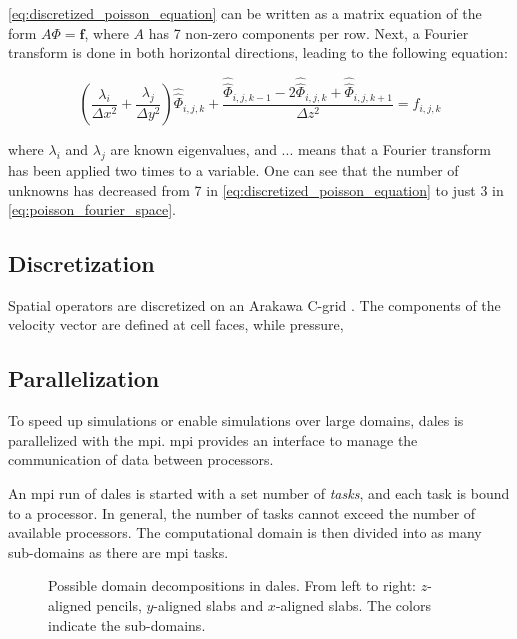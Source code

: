 \autoref{eq:discretized_poisson_equation} can be written as a matrix equation of the form $A \Phi = \mathbf{f}$, where $A$ has 7 non-zero components per row. Next, a Fourier transform is done in both horizontal directions, leading to the following equation: 

\begin{equation}
    \left( \frac{\lambda_i}{\Delta x^2} + \frac{\lambda_j}{\Delta y^2} \right) \hat{\hat{\Phi}}_{i,j,k} + \frac{\hat{\hat{\Phi}}_{i,j,k-1} - 2 \hat{\hat{\Phi}}_{i,j,k} + \hat{\hat{\Phi}}_{i,j,k+1}}{\Delta z^2} = f_{i,j,k}
    \label{eq:poisson_fourier_space}
\end{equation}

where $\lambda_i$ and $\lambda_j$ are known eigenvalues, and ...  means that a Fourier transform has been applied two times to a variable. One can see that the number of unknowns has decreased from 7 in \autoref{eq:discretized_poisson_equation} to just 3 in \autoref{eq:poisson_fourier_space}. 

\subsection{Discretization}
Spatial operators are discretized on an Arakawa C-grid \citep{arakawaComputationalDesignBasic1977}. The components of the velocity vector are defined at cell faces, while pressure, 

\subsection{Parallelization}
To speed up simulations or enable simulations over large domains, \acrshort{dales} is parallelized with the \acrfull{mpi}. \acrshort{mpi} provides an interface to manage the communication of data between processors. 

An \acrshort{mpi} run of \acrshort{dales} is started with a set number of \emph{tasks}, and each task is bound to a processor. In general, the number of tasks cannot exceed the number of available processors. The computational domain is then divided into as many sub-domains as there are \acrshort{mpi} tasks. 

\begin{figure}[H]
    \centering
    
    \caption{Possible domain decompositions in \acrshort{dales}. From left to right: $z$-aligned pencils, $y$-aligned slabs and $x$-aligned slabs. The colors indicate the sub-domains.}
    \label{fig:dales_domain_decomposition}
\end{figure}
